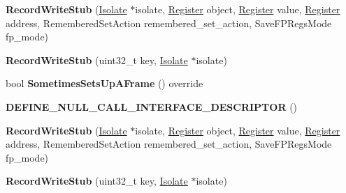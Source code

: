 \begin{DoxyCompactItemize}
\item 
{\bfseries Record\+Write\+Stub} (\hyperlink{classv8_1_1internal_1_1_isolate}{Isolate} $\ast$isolate, \hyperlink{structv8_1_1internal_1_1_register}{Register} object, \hyperlink{structv8_1_1internal_1_1_register}{Register} value, \hyperlink{structv8_1_1internal_1_1_register}{Register} address, Remembered\+Set\+Action remembered\+\_\+set\+\_\+action, Save\+F\+P\+Regs\+Mode fp\+\_\+mode)\hypertarget{classv8_1_1internal_1_1_record_write_stub_a6f773cf58e28bfb7b2c5da464fd3f145}{}\label{classv8_1_1internal_1_1_record_write_stub_a6f773cf58e28bfb7b2c5da464fd3f145}

\item 
{\bfseries Record\+Write\+Stub} (uint32\+\_\+t key, \hyperlink{classv8_1_1internal_1_1_isolate}{Isolate} $\ast$isolate)\hypertarget{classv8_1_1internal_1_1_record_write_stub_a9442f95c68a538cf8d22e7f5a7a247b5}{}\label{classv8_1_1internal_1_1_record_write_stub_a9442f95c68a538cf8d22e7f5a7a247b5}

\item 
bool {\bfseries Sometimes\+Sets\+Up\+A\+Frame} () override\hypertarget{classv8_1_1internal_1_1_record_write_stub_a636954d69a10f35b09d319f92e167699}{}\label{classv8_1_1internal_1_1_record_write_stub_a636954d69a10f35b09d319f92e167699}

\item 
{\bfseries D\+E\+F\+I\+N\+E\+\_\+\+N\+U\+L\+L\+\_\+\+C\+A\+L\+L\+\_\+\+I\+N\+T\+E\+R\+F\+A\+C\+E\+\_\+\+D\+E\+S\+C\+R\+I\+P\+T\+OR} ()\hypertarget{classv8_1_1internal_1_1_record_write_stub_a886f020173ce417f40c5704f6a582d6f}{}\label{classv8_1_1internal_1_1_record_write_stub_a886f020173ce417f40c5704f6a582d6f}

\item 
{\bfseries Record\+Write\+Stub} (\hyperlink{classv8_1_1internal_1_1_isolate}{Isolate} $\ast$isolate, \hyperlink{structv8_1_1internal_1_1_register}{Register} object, \hyperlink{structv8_1_1internal_1_1_register}{Register} value, \hyperlink{structv8_1_1internal_1_1_register}{Register} address, Remembered\+Set\+Action remembered\+\_\+set\+\_\+action, Save\+F\+P\+Regs\+Mode fp\+\_\+mode)\hypertarget{classv8_1_1internal_1_1_record_write_stub_a6f773cf58e28bfb7b2c5da464fd3f145}{}\label{classv8_1_1internal_1_1_record_write_stub_a6f773cf58e28bfb7b2c5da464fd3f145}

\item 
{\bfseries Record\+Write\+Stub} (uint32\+\_\+t key, \hyperlink{classv8_1_1internal_1_1_isolate}{Isolate} $\ast$isolate)\hypertarget{classv8_1_1internal_1_1_record_write_stub_a9442f95c68a538cf8d22e7f5a7a247b5}{}\label{classv8_1_1internal_1_1_record_write_stub_a9442f95c68a538cf8d22e7f5a7a247b5}


\end{DoxyCompactItemize}
